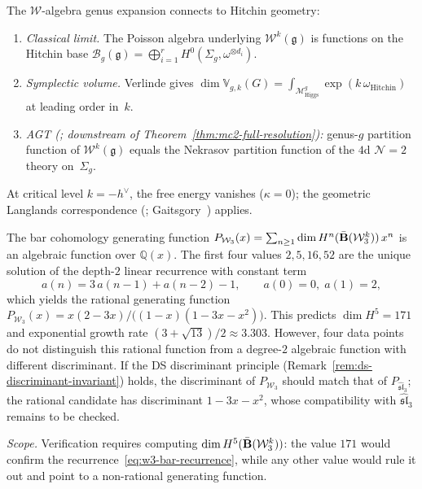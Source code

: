 \begin{remark}
\label{rem:w-higgs-connections}
The $\mathcal{W}$-algebra genus expansion connects to Hitchin geometry:
\begin{enumerate}[label=\textup{(\roman*)}]
\item \emph{Classical limit.}  The Poisson algebra underlying $\mathcal{W}^k(\mathfrak{g})$ is functions on the Hitchin base $\mathcal{B}_g(\mathfrak{g}) = \bigoplus_{i=1}^r H^0(\Sigma_g, \omega^{\otimes d_i})$.
\item \emph{Symplectic volume.}  Verlinde gives $\dim \mathbb{V}_{g,k}(G) = \int_{\mathcal{M}_{\mathrm{Higgs}}^g} \exp(k\,\omega_{\mathrm{Hitchin}})$ at leading order in~$k$.
\item \emph{AGT \textup{(\ClaimStatusConjectured; downstream of Theorem~\ref{thm:mc2-full-resolution})}:} genus-$g$ partition function of $\mathcal{W}^k(\mathfrak{g})$ equals the Nekrasov partition function of the $4$d $\mathcal{N}=2$ theory on~$\Sigma_g$.
\end{enumerate}
At critical level $k = -h^\vee$, the free energy vanishes ($\kappa = 0$); the geometric Langlands correspondence (\ClaimStatusProvedElsewhere; Gaitsgory~\cite{Gai19}) applies.
\end{remark}

\begin{conjecture}
\label{conj:w3-algebraicity}
The bar cohomology generating function $P_{\mathcal{W}_3}(x) = \sum_{n \geq 1} \dim H^n(\bar{\mathbf{B}}(\mathcal{W}_3^k))\, x^n$ is an algebraic function over $\mathbb{Q}(x)$.  The first four values $2, 5, 16, 52$ are the unique solution of the depth-$2$ linear recurrence with constant term
\begin{equation}\label{eq:w3-bar-recurrence}
a(n) = 3\,a(n{-}1) + a(n{-}2) - 1, \qquad a(0) = 0,\; a(1) = 2,
\end{equation}
which yields the rational generating function
$P_{\mathcal{W}_3}(x) = x(2-3x)/\bigl((1-x)(1-3x-x^2)\bigr)$.
This predicts $\dim H^5 = 171$ and exponential growth rate
$(3+\sqrt{13})/2 \approx 3.303$.
However, four data points do not distinguish this rational function
from a degree-$2$ algebraic function with different discriminant.
If the DS discriminant principle
(Remark~\ref{rem:ds-discriminant-invariant}) holds,
the discriminant of $P_{\mathcal{W}_3}$ should match that of
$P_{\widehat{\mathfrak{sl}}_3}$; the rational candidate has
discriminant $1 - 3x - x^2$, whose compatibility with
$\widehat{\mathfrak{sl}}_3$ remains to be checked.

\emph{Scope.}  Verification requires computing $\dim H^5(\bar{\mathbf{B}}(\mathcal{W}_3^k))$: the value $171$ would confirm the recurrence~\eqref{eq:w3-bar-recurrence}, while any other value would rule it out and point to a non-rational generating function.
\end{conjecture}

